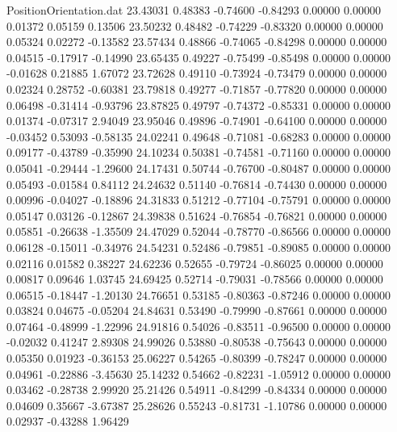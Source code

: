 \begin{filecontents}{PositionOrientation.dat}
  23.43031    0.48383   -0.74600    -0.84293    0.00000    0.00000    0.01372    0.05159    0.13506
  23.50232    0.48482   -0.74229    -0.83320    0.00000    0.00000    0.05324    0.02272   -0.13582
  23.57434    0.48866   -0.74065    -0.84298    0.00000    0.00000    0.04515   -0.17917   -0.14990
  23.65435    0.49227   -0.75499    -0.85498    0.00000    0.00000   -0.01628    0.21885    1.67072
  23.72628    0.49110   -0.73924    -0.73479    0.00000    0.00000    0.02324    0.28752   -0.60381
  23.79818    0.49277   -0.71857    -0.77820    0.00000    0.00000    0.06498   -0.31414   -0.93796
  23.87825    0.49797   -0.74372    -0.85331    0.00000    0.00000    0.01374   -0.07317    2.94049
  23.95046    0.49896   -0.74901    -0.64100    0.00000    0.00000   -0.03452    0.53093   -0.58135
  24.02241    0.49648   -0.71081    -0.68283    0.00000    0.00000    0.09177   -0.43789   -0.35990
  24.10234    0.50381   -0.74581    -0.71160    0.00000    0.00000    0.05041   -0.29444   -1.29600
  24.17431    0.50744   -0.76700    -0.80487    0.00000    0.00000    0.05493   -0.01584    0.84112
  24.24632    0.51140   -0.76814    -0.74430    0.00000    0.00000    0.00996   -0.04027   -0.18896
  24.31833    0.51212   -0.77104    -0.75791    0.00000    0.00000    0.05147    0.03126   -0.12867
  24.39838    0.51624   -0.76854    -0.76821    0.00000    0.00000    0.05851   -0.26638   -1.35509
  24.47029    0.52044   -0.78770    -0.86566    0.00000    0.00000    0.06128   -0.15011   -0.34976
  24.54231    0.52486   -0.79851    -0.89085    0.00000    0.00000    0.02116    0.01582    0.38227
  24.62236    0.52655   -0.79724    -0.86025    0.00000    0.00000    0.00817    0.09646    1.03745
  24.69425    0.52714   -0.79031    -0.78566    0.00000    0.00000    0.06515   -0.18447   -1.20130
  24.76651    0.53185   -0.80363    -0.87246    0.00000    0.00000    0.03824    0.04675   -0.05204
  24.84631    0.53490   -0.79990    -0.87661    0.00000    0.00000    0.07464   -0.48999   -1.22996
  24.91816    0.54026   -0.83511    -0.96500    0.00000    0.00000   -0.02032    0.41247    2.89308
  24.99026    0.53880   -0.80538    -0.75643    0.00000    0.00000    0.05350    0.01923   -0.36153
  25.06227    0.54265   -0.80399    -0.78247    0.00000    0.00000    0.04961   -0.22886   -3.45630
  25.14232    0.54662   -0.82231    -1.05912    0.00000    0.00000    0.03462   -0.28738    2.99920
  25.21426    0.54911   -0.84299    -0.84334    0.00000    0.00000    0.04609    0.35667   -3.67387
  25.28626    0.55243   -0.81731    -1.10786    0.00000    0.00000    0.02937   -0.43288    1.96429

\end{filecontents}
